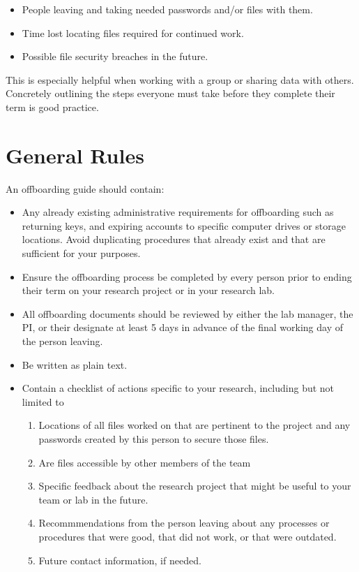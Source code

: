 \documentclass[
]{book}
\providecommand{\tightlist}{%
  \setlength{\itemsep}{0pt}\setlength{\parskip}{0pt}}
\begin{document}
\begin{itemize}
\tightlist
\item
  People leaving and taking needed passwords and/or files with them.
\item
  Time lost locating files required for continued work.
\item
  Possible file security breaches in the future.
\end{itemize}

This is especially helpful when working with a group or sharing data with others. Concretely outlining the steps everyone must take before they complete their term is good practice.

\hypertarget{general-rules-5}{%
\section*{General Rules}\label{general-rules-5}}

An offboarding guide should contain:

\begin{itemize}
\tightlist
\item
  Any already existing administrative requirements for offboarding such as returning keys, and expiring accounts to specific computer drives or storage locations. Avoid duplicating procedures that already exist and that are sufficient for your purposes.
\item
  Ensure the offboarding process be completed by every person prior to ending their term on your research project or in your research lab.
\item
  All offboarding documents should be reviewed by either the lab manager, the PI, or their designate at least 5 days in advance of the final working day of the person leaving.
\item
  Be written as plain text.
\item
  Contain a checklist of actions specific to your research, including but not limited to

  \begin{enumerate}
  \def\labelenumi{\arabic{enumi}.}
  \tightlist
  \item
    Locations of all files worked on that are pertinent to the project and any passwords created by this person to secure those files.
  \item
    Are files accessible by other members of the team
  \item
    Specific feedback about the research project that might be useful to your team or lab in the future.
  \item
    Recommmendations from the person leaving about any processes or procedures that were good, that did not work, or that were outdated.
  \item
    Future contact information, if needed.
  \end{enumerate}
\end{itemize}
\end{document}
